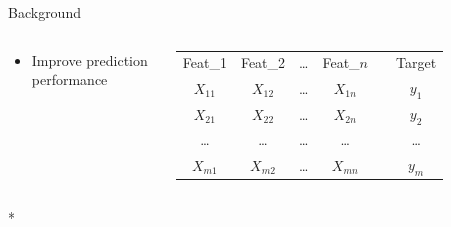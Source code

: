 \documentclass[en, navbarinline, handout]{sdqbeamer}
\begin{document}
\begin{frame}[t]{Background}
\begin{columns}
\begin{itemize}
\begin{itemize}
				\item Improve prediction performance
			\end{itemize}
		\end{itemize}
		\pause[2] %
		\vspace{-0.5\baselineskip}
		\begin{table}
			\begin{tabular}{cccccc}
				\cmidrule(lr){1-4} \cmidrule(lr){6-6}
				Feat\_1 & Feat\_2 & \dots & Feat\_$n$ & \quad & Target \\
				\cmidrule(lr){1-4} \cmidrule(lr){6-6}
				$X_{11}$ & $X_{12}$ & \dots & $X_{1n}$ & & $y_1$ \\
				$X_{21}$ & $X_{22}$ & \dots & $X_{2n}$ & & $y_2$ \\
				\dots & \dots & \dots & \dots & & \dots \\
				$X_{m1}$ & $X_{m2}$ & \dots & $X_{mn}$ & & $y_m$ \\
				\cmidrule(lr){1-4} \cmidrule(lr){6-6}
			\end{tabular}
		\end{table}
	\end{columns}
*\end{frame}
\end{document}
